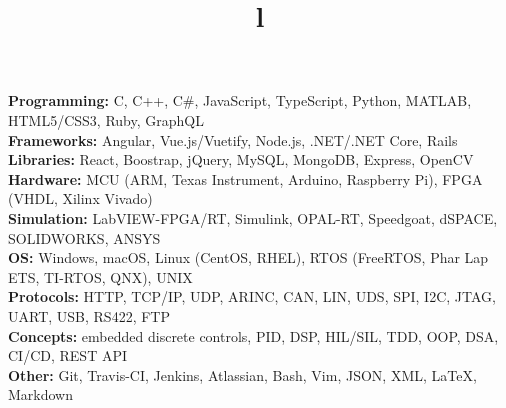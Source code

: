 \documentclass[mm]{res}
\begin{document}



\begin{resume}

\npspctoprule
\section{\headingskills}
\tb \textbf{Programming:} C, C++, C\#, JavaScript, TypeScript, Python, MATLAB, HTML5/CSS3, Ruby, GraphQL\\
\tb \textbf{Frameworks:} Angular, Vue.js/Vuetify, Node.js, .NET/.NET Core, Rails\\
\tb \textbf{Libraries:} React, Boostrap, jQuery, MySQL, MongoDB, Express, OpenCV\\
\tb \textbf{Hardware:} MCU (ARM, Texas Instrument, Arduino, Raspberry Pi), FPGA (VHDL, Xilinx Vivado)\\
\tb \textbf{Simulation:} LabVIEW-FPGA/RT, Simulink, OPAL-RT, Speedgoat, dSPACE, SOLIDWORKS, ANSYS\\
\tb \textbf{OS:} Windows, macOS, Linux (CentOS, RHEL), RTOS (FreeRTOS, Phar Lap ETS, TI-RTOS, QNX), UNIX\\
\tb \textbf{Protocols:} HTTP, TCP/IP, UDP, ARINC, CAN, LIN, UDS, SPI, I2C, JTAG, UART, USB, RS422, FTP\\
\tb \textbf{Concepts:} embedded discrete controls, PID, DSP, HIL/SIL, TDD, OOP, DSA, CI/CD, REST API\\
\tb \textbf{Other:} Git, Travis-CI, Jenkins, Atlassian, Bash, Vim, JSON, XML, \LaTeX, Markdown


\toprule

\section{\headingeducation}
\begin{format}
\\
\title{l}\\
\end{format}


\end{resume}
\end{document}
